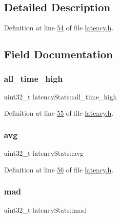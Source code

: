 \subsection{Detailed Description}


Definition at line \hyperlink{latency_8h_source_l00054}{54} of file \hyperlink{latency_8h_source}{latency.\+h}.



\subsection{Field Documentation}
\mbox{\label{structlatencyStats_a1ce73f3dd6b3787f6ba4f4bd883848ef}} 
\subsubsection{\texorpdfstring{all\+\_\+time\+\_\+high}{all\_time\_high}}
{\footnotesize\ttfamily uint32\+\_\+t latency\+Stats\+::all\+\_\+time\+\_\+high}



Definition at line \hyperlink{latency_8h_source_l00055}{55} of file \hyperlink{latency_8h_source}{latency.\+h}.

\mbox{\label{structlatencyStats_afe95b3cbb8b32557b16675a19a40aea4}} 
\subsubsection{\texorpdfstring{avg}{avg}}
{\footnotesize\ttfamily uint32\+\_\+t latency\+Stats\+::avg}



Definition at line \hyperlink{latency_8h_source_l00056}{56} of file \hyperlink{latency_8h_source}{latency.\+h}.

\mbox{\label{structlatencyStats_ae915b37631c7aed2c39e02411bcf74fd}} 
\subsubsection{\texorpdfstring{mad}{mad}}
{\footnotesize\ttfamily uint32\+\_\+t latency\+Stats\+::mad}



